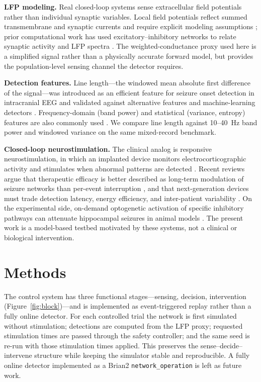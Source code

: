 \documentclass[12pt]{article}
\begin{document}
\textbf{LFP modeling.} Real closed-loop systems sense extracellular field potentials rather than individual synaptic variables. Local field potentials reflect summed transmembrane and synaptic currents and require explicit modeling assumptions \cite{einevoll2013}; prior computational work has used excitatory--inhibitory networks to relate synaptic activity and LFP spectra \cite{mazzoni2008}. The weighted-conductance proxy used here is a simplified signal rather than a physically accurate forward model, but provides the population-level sensing channel the detector requires.

\textbf{Detection features.} Line length---the windowed mean absolute first difference of the signal---was introduced as an efficient feature for seizure onset detection in intracranial EEG \cite{esteller2001} and validated against alternative features and machine-learning detectors \cite{guo2010,dumpelmann2019}. Frequency-domain (band power) and statistical (variance, entropy) features are also commonly used \cite{kassiri2024}. We compare line length against 10--40~Hz band power and windowed variance on the same mixed-record benchmark.

\textbf{Closed-loop neurostimulation.} The clinical analog is responsive neurostimulation, in which an implanted device monitors electrocorticographic activity and stimulates when abnormal patterns are detected \cite{morrell2011,nair2020,sisterson2020}. Recent reviews argue that therapeutic efficacy is better described as long-term modulation of seizure networks than per-event interruption \cite{sisterson2020}, and that next-generation devices must trade detection latency, energy efficiency, and inter-patient variability \cite{kassiri2024,dumpelmann2019}. On the experimental side, on-demand optogenetic activation of specific inhibitory pathways can attenuate hippocampal seizures in animal models \cite{streng2021}. The present work is a model-based testbed motivated by these systems, not a clinical or biological intervention.

\section{Methods}
The control system has three functional stages---sensing, decision, intervention (Figure~\ref{fig:block})---and is implemented as event-triggered replay rather than a fully online detector. For each controlled trial the network is first simulated without stimulation; detections are computed from the LFP proxy; requested stimulation times are passed through the safety controller; and the same seed is re-run with those stimulation times applied. This preserves the sense--decide--intervene structure while keeping the simulator stable and reproducible. A fully online detector implemented as a Brian2 \texttt{network\_operation} is left as future work.
\end{document}
